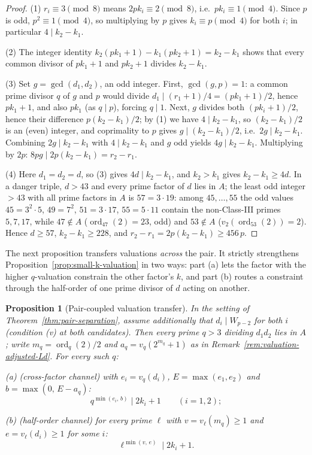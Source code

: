 \documentclass[11pt]{amsart}
\theoremstyle{plain}
\newtheorem{proposition}[theorem]{Proposition}
\theoremstyle{definition}
\theoremstyle{remark}
\numberwithin{equation}{section}
\newcommand{\ord}{\operatorname{ord}}
\begin{document}
\begin{proof}
(1) $r_i \equiv 3 \pmod 8$ means $2 p k_i \equiv 2 \pmod 8$, i.e.\ $p k_i \equiv 1 \pmod 4$. Since $p$ is odd, $p^2 \equiv 1 \pmod 4$, so multiplying by $p$ gives $k_i \equiv p \pmod 4$ for both $i$; in particular $4 \mid k_2 - k_1$.

(2) The integer identity $k_2 (p k_1 + 1) - k_1 (p k_2 + 1) = k_2 - k_1$ shows that every common divisor of $p k_1 + 1$ and $p k_2 + 1$ divides $k_2 - k_1$.

(3) Set $g = \gcd(d_1, d_2)$, an odd integer. First, $\gcd(g, p) = 1$: a common prime divisor $q$ of $g$ and $p$ would divide $d_1 \mid (r_1 + 1)/4 = (p k_1 + 1)/2$, hence $p k_1 + 1$, and also $p k_1$ (as $q \mid p$), forcing $q \mid 1$. Next, $g$ divides both $(p k_i + 1)/2$, hence their difference $p (k_2 - k_1)/2$; by (1) we have $4 \mid k_2 - k_1$, so $(k_2 - k_1)/2$ is an (even) integer, and coprimality to $p$ gives $g \mid (k_2 - k_1)/2$, i.e.\ $2 g \mid k_2 - k_1$. Combining $2 g \mid k_2 - k_1$ with $4 \mid k_2 - k_1$ and $g$ odd yields $4 g \mid k_2 - k_1$. Multiplying by $2 p$: $8 p g \mid 2 p (k_2 - k_1) = r_2 - r_1$.

(4) Here $d_1 = d_2 = d$, so (3) gives $4 d \mid k_2 - k_1$, and $k_2 > k_1$ gives $k_2 - k_1 \geq 4 d$. In a danger triple, $d > 43$ and every prime factor of $d$ lies in $A$; the least odd integer $> 43$ with all prime factors in $A$ is $57 = 3 \cdot 19$: among $45, \dots, 55$ the odd values $45 = 3^2 \cdot 5$, $49 = 7^2$, $51 = 3 \cdot 17$, $55 = 5 \cdot 11$ contain the non-Class-III primes $5, 7, 17$, while $47 \notin A$ ($\ord_{47}(2) = 23$, odd) and $53 \notin A$ ($v_2(\ord_{53}(2)) = 2$). Hence $d \geq 57$, $k_2 - k_1 \geq 228$, and $r_2 - r_1 = 2 p (k_2 - k_1) \geq 456\, p$.
\end{proof}

The next proposition transfers valuations \emph{across} the pair. It strictly strengthens Proposition~\ref{prop:small-k-valuation} in two ways: part (a) lets the factor with the higher $q$-valuation constrain the other factor's $k$, and part (b) routes a constraint through the half-order of one prime divisor of $d$ acting on another.

\begin{proposition}[Pair-coupled valuation transfer]\label{prop:pair-couplings}
In the setting of Theorem~\ref{thm:pair-separation}, assume additionally that $d_i \mid W_{p-2}$ for both $i$ (condition (v) at both candidates). Then every prime $q > 3$ dividing $d_1 d_2$ lies in $A$; write $m_q = \ord_q(2)/2$ and $a_q = v_q(2^{m_q} + 1)$ as in Remark~\ref{rem:valuation-adjusted-Ld}. For every such $q$:

(a) (\emph{cross-factor channel}) with $e_i = v_q(d_i)$, $E = \max(e_1, e_2)$ and $b = \max(0,\, E - a_q)$:
\[
  q^{\min(e_i,\, b)} \;\Big|\; 2 k_i + 1 \qquad (i = 1, 2);
\]

(b) (\emph{half-order channel}) for every prime $\ell$ with $v = v_\ell(m_q) \geq 1$ and $e = v_\ell(d_i) \geq 1$ for some $i$:
\[
  \ell^{\min(v,\, e)} \;\Big|\; 2 k_i + 1.
\]
\end{proposition}
\end{document}
